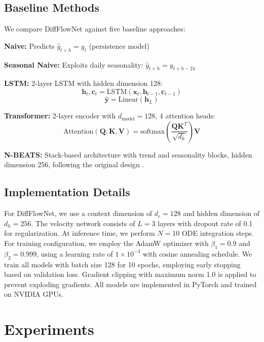 \documentclass[11pt,a4paper]{article}
\begin{document}
\subsection{Baseline Methods}

We compare DiffFlowNet against five baseline approaches:

\textbf{Naive:} Predicts $\hat{y}_{t+h} = y_t$ (persistence model)

\textbf{Seasonal Naive:} Exploits daily seasonality: $\hat{y}_{t+h} = y_{t+h-24}$

\textbf{LSTM:} 2-layer LSTM with hidden dimension 128:
\begin{equation}
    \mathbf{h}_t, \mathbf{c}_t = \text{LSTM}(\mathbf{x}_t, \mathbf{h}_{t-1}, \mathbf{c}_{t-1})
\end{equation}
\begin{equation}
    \hat{\mathbf{y}} = \text{Linear}(\mathbf{h}_L)
\end{equation}

\textbf{Transformer:} 2-layer encoder with $d_{\text{model}}=128$, 4 attention heads:
\begin{equation}
    \text{Attention}(\mathbf{Q}, \mathbf{K}, \mathbf{V}) = \text{softmax}\left(\frac{\mathbf{QK}^T}{\sqrt{d_k}}\right)\mathbf{V}
\end{equation}

\textbf{N-BEATS:} Stack-based architecture with trend and seasonality blocks, hidden dimension 256, following the original design \cite{oreshkin2019nbeats}.

\subsection{Implementation Details}

For DiffFlowNet, we use a context dimension of $d_c = 128$ and hidden dimension of $d_h = 256$. The velocity network consists of $L = 3$ layers with dropout rate of 0.1 for regularization. At inference time, we perform $N = 10$ ODE integration steps. For training configuration, we employ the AdamW optimizer with $\beta_1=0.9$ and $\beta_2=0.999$, using a learning rate of $1 \times 10^{-3}$ with cosine annealing schedule. We train all models with batch size 128 for 10 epochs, employing early stopping based on validation loss. Gradient clipping with maximum norm 1.0 is applied to prevent exploding gradients. All models are implemented in PyTorch and trained on NVIDIA GPUs.

\section{Experiments}
\end{document}
